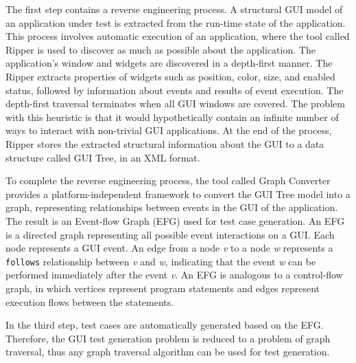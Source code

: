 The first step contains a reverse engineering process. A structural GUI model of an application under test is extracted from the run-time state of the application. This process involves automatic execution of an application, where the tool called Ripper is used to discover as much as possible about the application. The application's window and widgets are discovered in a depth-first manner. The Ripper extracts properties of widgets such as position, color, size, and enabled status, followed by information about events and results of event execution. The depth-first traversal terminates when all GUI windows are covered. The problem with this heuristic is that it would hypothetically contain an infinite number of ways to interact with non-trivial GUI applications. At the end of the process, Ripper stores the extracted structural information about the GUI to a data structure called GUI Tree, in an XML format.

To complete the reverse engineering process, the tool called Graph Converter provides a platform-independent framework to convert the GUI Tree model into a graph, representing relationships between events in the GUI of the application. The result is an Event-flow Graph (EFG) used for test case generation.
An EFG is a directed graph representing all possible event interactions on a GUI. Each node represents a GUI event. An edge from a node \textit{v} to a node \textit{w} represents a \verb|follows| relationship between \textit{v} and \textit{w}, indicating that the event \textit{w} can be performed immediately after the event  \textit{v}. An EFG is analogous to a control-flow graph, in which vertices represent program statements and edges represent execution flows between the statements.

In the third step, test cases are automatically generated based on the EFG. Therefore, the GUI test generation problem is reduced to a problem of graph traversal, thus any graph traversal algorithm can be used for test generation. 



